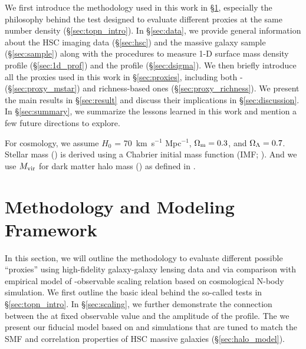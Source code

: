 \documentclass[fleqn,usenatbib,useAMS,english]{mnras}
\begin{document}
    We first introduce the methodology used in this work in \S \ref{sec:method}, especially the
    philosophy behind the \topn{} test designed to evaluate different \mvir{} proxies at the
    same number density (\S \ref{sec:topn_intro}).
    In \S \ref{sec:data}, we provide general information about the HSC imaging data
    (\S \ref{sec:hsc}) and the massive galaxy sample (\S \ref{sec:sample}) along with the
    procedures to measure 1-D surface mass density profile (\S \ref{sec:1d_prof}) and the
    \dsigma{} profile (\S \ref{sec:dsigma}).
    We then briefly introduce all the \mvir{} proxies used in this work in \S \ref{sec:proxies},
    including both \mstar{}- (\S \ref{sec:proxy_mstar}) and richness-based ones
    (\S \ref{sec:proxy_richness}).
    We present the main results in \S \ref{sec:result} and
    discuss their implications in \S \ref{sec:discussion}.
    In \S \ref{sec:summary}, we summarize the lessons learned in this work and mention a few
    future directions to explore.


    For cosmology, we assume $H_0$ = 70~km~s$^{-1}$ Mpc$^{-1}$,
    ${\Omega}_{\rm m}=0.3$, and ${\Omega}_{\rm \Lambda}=0.7$.
    Stellar mass (\mstar{}) is derived using a Chabrier initial mass function
    (IMF; \citealt{Chabrier2003}).
    And we use $M_{\rm vir}$ for dark matter halo mass (\mhalo{}) as
    defined in \citealt{BryanNorman1998}.


\section{Methodology and Modeling Framework}
    \label{sec:method}

    In this section, we will outline the methodology to evaluate different possible \mvir{}
    ``proxies'' using high-fidelity galaxy-galaxy lensing data and via comparison with empirical
    model of \mvir{}-observable scaling relation based on cosmological N-body simulation.
    We first outline the basic ideal behind the so-called \topn{} tests in \S \ref{sec:topn_intro}.
    In \S \ref{sec:scaling}, we further demonstrate the connection between the \sigmh{} at
    fixed observable value and the amplitude of the \dsigma{} profile.
    The we present our fiducial model based on  and \smdpl{} simulations that are
    tuned to match the SMF and correlation properties of HSC massive galaxies
    (\S \ref{sec:halo_model}).
\end{document}
